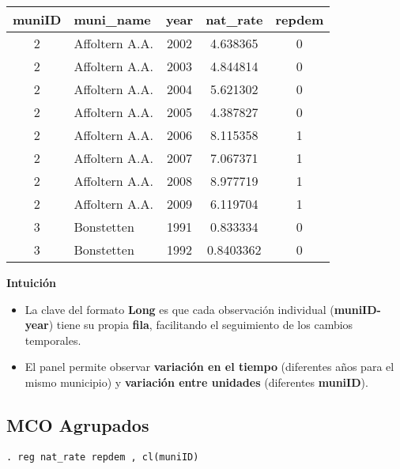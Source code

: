 \documentclass[12pt]{article}
\begin{document}
\begin{table}[H]
    \centering
    \begin{tabular}{|c|l|c|c|c|}
        \hline
        \textbf{muniID} & \textbf{muni\_name} & \textbf{year} & \textbf{nat\_rate} & \textbf{repdem} \\
        \hline
        2 & Affoltern A.A. & 2002 & 4.638365 & 0 \\
        2 & Affoltern A.A. & 2003 & 4.844814 & 0 \\
        2 & Affoltern A.A. & 2004 & 5.621302 & 0 \\
        2 & Affoltern A.A. & 2005 & 4.387827 & 0 \\
        2 & Affoltern A.A. & 2006 & 8.115358 & 1 \\
        \hline
        2 & Affoltern A.A. & 2007 & 7.067371 & 1 \\
        2 & Affoltern A.A. & 2008 & 8.977719 & 1 \\
        2 & Affoltern A.A. & 2009 & 6.119704 & 1 \\
        3 & Bonstetten & 1991 & 0.833334 & 0 \\
        3 & Bonstetten & 1992 & 0.8403362 & 0 \\
        \hline
    \end{tabular}
\end{table}

\vspace{0.5cm}

\noindent\textbf{Intuición}
\begin{itemize}
    \item La clave del formato \textbf{Long} es que cada observación individual (\textbf{muniID-year}) tiene su propia \textbf{fila}, facilitando el seguimiento de los cambios temporales.
    \item El panel permite observar \textbf{variación en el tiempo} (diferentes años para el mismo municipio) y \textbf{variación entre unidades} (diferentes \textbf{muniID}).
\end{itemize}

\subsection*{\noindent\textbf{MCO Agrupados}}

\begin{verbatim}
. reg nat_rate repdem , cl(muniID)
\end{verbatim}
\end{document}
